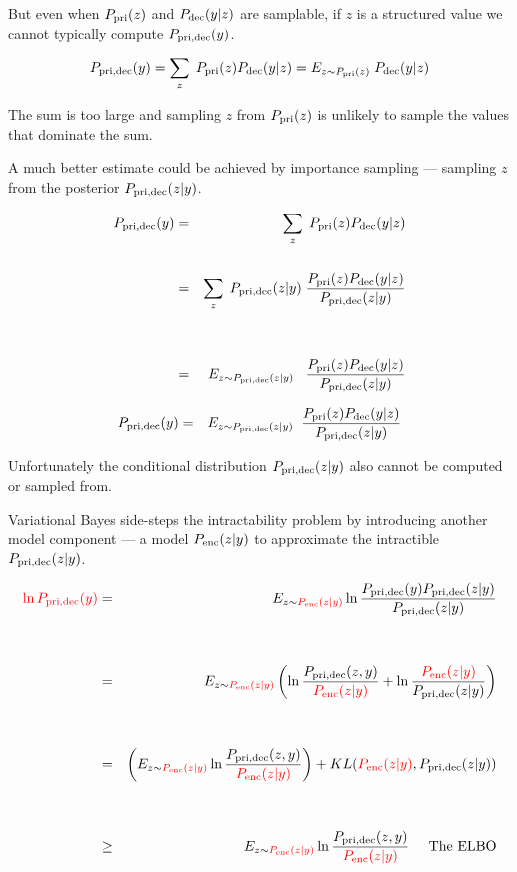 {

But even when $P_{\mathrm{pri}}(z)$ and $P_{\mathrm{dec}}(y|z)$ are samplable, if $z$ is a structured value we cannot typically compute $P_{\mathrm{pri},\mathrm{dec}}(y)$.

\vfill
$$P_{\mathrm{pri},\mathrm{dec}}(y) = \sum_z\;P_{\mathrm{pri}}(z)P_{\mathrm{dec}}(y|z) = E_{z\sim P_{\mathrm{pri}}(z)}\;P_{\mathrm{dec}}(y|z)$$

\vfill
The sum is too large and sampling $z$ from $P_{\mathrm{pri}}(z)$ is unlikely to sample the values that dominate the sum.


\vfill
A much better estimate could be achieved by importance sampling --- sampling $z$ from the posterior $P_{\mathrm{pri},\mathrm{dec}}(z|y)$.

{\huge
\begin{eqnarray*}
P_{\mathrm{pri},\mathrm{dec}}(y) & = & \sum_z\;P_{\mathrm{pri}}(z) P_{\mathrm{dec}}(y|z) \\
\\
 & = & \sum_z\;P_{\mathrm{pri},\mathrm{dec}}(z|y)\;\frac{P_{\mathrm{pri}}(z)P_{\mathrm{dec}}(y|z)}{P_{\mathrm{pri},\mathrm{dec}}(z|y)} \\
 \\
 \\
  & = & E_{z\sim P_{\mathrm{pri},\mathrm{dec}}(z|y)}\;\;\;\frac{P_{\mathrm{pri}}(z)P_{\mathrm{dec}}(y|z)}{P_{\mathrm{pri},\mathrm{dec}}(z|y)}
\end{eqnarray*}
}


\begin{eqnarray*}
P_{\mathrm{pri},\mathrm{dec}}(y) & = & E_{z\sim P_{\mathrm{pri},\mathrm{dec}}(z|y)}\;\;\frac{P_{\mathrm{pri}}(z)P_{\mathrm{dec}}(y|z)}{P_{\mathrm{pri},\mathrm{dec}}(z|y)}
\end{eqnarray*}

\vfill
Unfortunately the conditional distribution $P_{\mathrm{pri},\mathrm{dec}}(z|y)$ also cannot be computed or sampled from.

\vfill
Variational Bayes side-steps the intractability problem by introducing another model component --- a model $P_{\mathrm{enc}}(z|y)$ to approximate the intractible $P_{\mathrm{pri},\mathrm{dec}}(z|y)$.


{\huge
\begin{eqnarray*}
 {\color{red} \ln P_{\mathrm{pri},\mathrm{dec}}(y)} & = & E_{z \sim {\color{red} P_{\mathrm{enc}}(z|y)}} \ln \frac{P_{\mathrm{pri},\mathrm{dec}}(y)P_{\mathrm{pri},\mathrm{dec}}(z|y)}{P_{\mathrm{pri},\mathrm{dec}}(z|y)} \\
        \\
        \\
 & = & E_{z \sim {\color{red} P_{\mathrm{enc}}(z|y)}} \left(\ln \frac{P_{\mathrm{pri},\mathrm{dec}}(z,y)}{{\color{red} P_{\mathrm{enc}}(z|y)}} + \ln \frac{{\color{red} P_{\mathrm{enc}}(z|y)}}{P_{\mathrm{pri},\mathrm{dec}}(z|y)}\right) \\
 \\
 \\
  & = & \left(E_{z \sim {\color{red} P_{\mathrm{enc}}(z|y)}} \ln \frac{P_{\mathrm{pri},\mathrm{dec}}(z,y)}{{\color{red} P_{\mathrm{enc}}(z|y)}}\right) + KL({\color{red} P_{\mathrm{enc}}(z|y)},P_{\mathrm{pri},\mathrm{dec}}(z|y)) \\
  \\
  \\
  &  \geq & E_{z \sim {\color{red} P_{\mathrm{enc}}(z|y)}} \ln \frac{P_{\mathrm{pri},\mathrm{dec}}(z,y)}{{\color{red} P_{\mathrm{enc}}(z|y)}} \;\;\;\;\;\mbox{The ELBO}
\end{eqnarray*}
}

}
